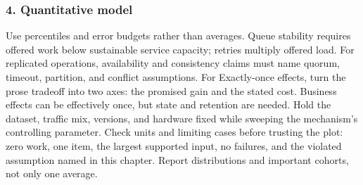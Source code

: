 \subsubsection*{4. Quantitative model}
Use percentiles and error budgets rather than averages. Queue stability requires offered work below sustainable service capacity; retries multiply offered load. For replicated operations, availability and consistency claims must name quorum, timeout, partition, and conflict assumptions.
For Exactly-once effects, turn the prose tradeoff into two axes: the promised gain and the stated cost. Business effects can be effectively once, but state and retention are needed. Hold the dataset, traffic mix, versions, and hardware fixed while sweeping the mechanism's controlling parameter.
Check units and limiting cases before trusting the plot: zero work, one item, the largest supported input, no failures, and the violated assumption named in this chapter. Report distributions and important cohorts, not only one average.
